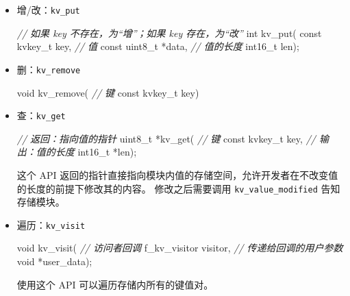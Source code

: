 \documentclass[
  12pt,
]{book}
\newenvironment{Shaded}{\begin{snugshade}}{\end{snugshade}}
\newcommand{\CommentTok}[1]{\textcolor[rgb]{0.56,0.35,0.01}{\textit{#1}}}
\newcommand{\DataTypeTok}[1]{\textcolor[rgb]{0.13,0.29,0.53}{#1}}
\newcommand{\NormalTok}[1]{#1}
\begin{document}
\begin{itemize}
\item
  增/改：\texttt{kv\_put}

\begin{Shaded}
\begin{Highlighting}[]
\CommentTok{// 如果 key 不存在，为“增”；如果 key 存在，为“改”}
\DataTypeTok{int}\NormalTok{ kv_put(}
  \DataTypeTok{const}\NormalTok{ kvkey_t key,}
  \CommentTok{// 值}
  \DataTypeTok{const} \DataTypeTok{uint8_t}\NormalTok{ *data,}
  \CommentTok{// 值的长度}
  \DataTypeTok{int16_t}\NormalTok{ len);}
\end{Highlighting}
\end{Shaded}
\item
  删：\texttt{kv\_remove}

\begin{Shaded}
\begin{Highlighting}[]
\DataTypeTok{void}\NormalTok{ kv_remove(}
  \CommentTok{// 键}
  \DataTypeTok{const}\NormalTok{ kvkey_t key)}
\end{Highlighting}
\end{Shaded}
\item
  查：\texttt{kv\_get}

\begin{Shaded}
\begin{Highlighting}[]
\CommentTok{// 返回：指向值的指针}
\DataTypeTok{uint8_t}\NormalTok{ *kv_get(}
  \CommentTok{// 键}
  \DataTypeTok{const}\NormalTok{ kvkey_t key,}
  \CommentTok{// 输出：值的长度}
  \DataTypeTok{int16_t}\NormalTok{ *len);}
\end{Highlighting}
\end{Shaded}

  这个 API 返回的指针直接指向模块内值的存储空间，允许开发者在不改变值的长度的前提下修改其的内容。
  修改之后需要调用 \texttt{kv\_value\_modified} 告知存储模块。
\item
  遍历：\texttt{kv\_visit}

\begin{Shaded}
\begin{Highlighting}[]
\DataTypeTok{void}\NormalTok{ kv_visit(}
  \CommentTok{// 访问者回调}
\NormalTok{  f_kv_visitor visitor,}
  \CommentTok{// 传递给回调的用户参数}
  \DataTypeTok{void}\NormalTok{ *user_data);}
\end{Highlighting}
\end{Shaded}

  使用这个 API 可以遍历存储内所有的键值对。
\end{itemize}
\end{document}
